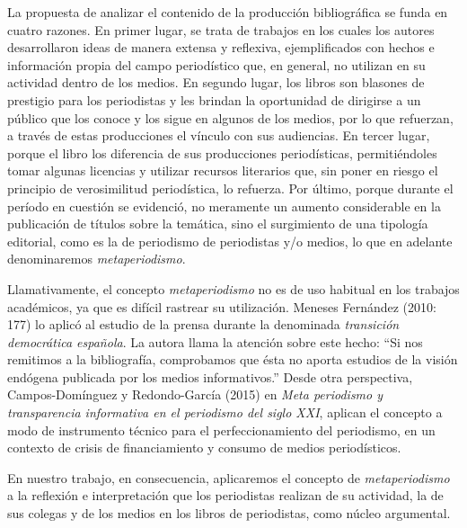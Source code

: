 La propuesta de analizar el contenido de la producción bibliográfica se funda en cuatro razones. En primer lugar, se trata de trabajos en los cuales los autores desarrollaron ideas de manera extensa y reflexiva, ejemplificados con hechos e información propia del campo periodístico que, en general, no utilizan en su actividad dentro de los medios. En segundo lugar, los libros son blasones de prestigio para los periodistas y les brindan la oportunidad de dirigirse a un público que los conoce y los sigue en algunos de los medios, por lo que refuerzan, a través de estas producciones el vínculo con sus audiencias. En tercer lugar, porque el libro los diferencia de sus producciones periodísticas, permitiéndoles tomar algunas licencias y utilizar recursos literarios que, sin poner en riesgo el principio de verosimilitud periodística, lo refuerza. Por último, porque durante el período en cuestión se evidenció, no meramente un aumento considerable en la publicación de títulos sobre la temática, sino el surgimiento de una tipología editorial, como es la de periodismo de periodistas y/o medios, lo que en adelante denominaremos \emph{metaperiodismo}.

Llamativamente, el concepto \emph{metaperiodismo} no es de uso habitual en los trabajos académicos, ya que es difícil rastrear su utilización. Meneses Fernández (2010: 177) lo aplicó al estudio de la prensa durante la denominada \emph{transición democrática española}. La autora llama la atención sobre este hecho: \enquote{Si nos remitimos a la bibliografía, comprobamos que ésta no aporta estudios de la visión endógena publicada por los medios informativos.}
Desde otra perspectiva, Campos-Domínguez y Redondo-García (2015) en \emph{Meta periodismo y transparencia informativa en el periodismo del siglo XXI}, aplican el concepto a modo de instrumento técnico para el perfeccionamiento del periodismo, en un contexto de crisis de financiamiento y consumo de medios periodísticos.

En nuestro trabajo, en consecuencia, aplicaremos el concepto de \emph{metaperiodismo} a la reflexión e interpretación que los periodistas realizan de su actividad, la de sus colegas y de los medios en los libros de periodistas, como núcleo argumental.

